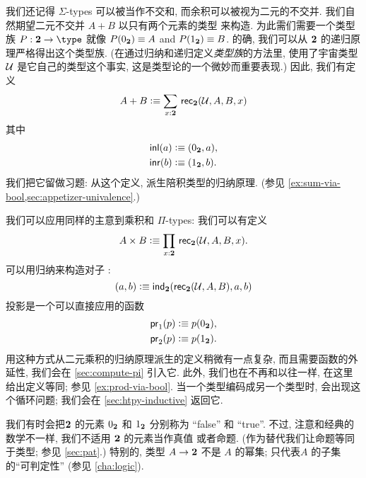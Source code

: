 我们还记得 $\Sigma$-types 可以被当作不交和,  而余积可以被视为二元的不交并. 我们自然期望二元不交并 $A+B$ 以只有两个元素的类型 \bool 来构造. 为此需们需要一个类型族 $P:\bool\to\type$ 就像 $P({0_{\mathbf{2}}})\equiv A$ and $P({1_{\mathbf{2}}})\equiv B$. 的确, 我们可以从 $\mathbf{2}$ 的递归原理严格得出这个类型族. %
(在通过归纳和递归定义\emph{类型族}的方法里, 使用了宇宙类型 $\mathcal{U}$ 是它自己的类型这个事实, 这是类型论的一个微妙而重要表现.) 因此, 我们有定义 %
\[ A + B \defeq \sm{x:\bool} \rec{\bool}(\UU,A,B,x) \]
其中 \begin{align*}
{\mathsf{inl}}(a) &\vcentcolon\equiv ({0_{\mathbf{2}}},a), \\
{\mathsf{inr}}(b) &\vcentcolon\equiv ({1_{\mathbf{2}}},b).
\end{align*}
我们把它留做习题: 从这个定义, 派生陪积类型的归纳原理. (参见 \cref{ex:sum-via-bool,sec:appetizer-univalence}.) 

我们可以应用同样的主意到乘积和 $\Pi$-types: 我们可以有定义 \[ A \times B \defeq \prd{x:\bool}\rec{\bool}(\UU,A,B,x). \]
可以用归纳来构造对子 \bool: \[ (a,b) \vcentcolon\equiv \mathsf{ind}_{\mathbf{2}}(\mathsf{rec}_{\mathbf{2}}(\mathcal{U},A,B),a,b) \]
投影是一个可以直接应用的函数 \begin{align*}
\mathsf{pr}_{1}(p) &\vcentcolon\equiv p({0_{\mathbf{2}}}), \\
\mathsf{pr}_{2}(p) &\vcentcolon\equiv p({1_{\mathbf{2}}}).
\end{align*}
用这种方式从二元乘积的归纳原理派生的定义稍微有一点复杂, 而且需要函数的外延性, 我们会在 \cref{sec:compute-pi} 引入它. 此外, 我们也在不再和以往一样, 在这里给出定义等同; 参见 \cref{ex:prod-via-bool}. 当一个类型编码成另一个类型时, 会出现这个循环问题; 我们会在 \cref{sec:htpy-inductive} 返回它.  

我们有时会把$\mathbf{2}$ 的元素 ${0_{\mathbf{2}}}$ 和 ${1_{\mathbf{2}}}$  分别称为 ``false'' 和 ``true''. 不过, 注意和经典的数学不一样, 我们不适用 $\mathbf{2}$ 的元素当作真值%
或者命题. (作为替代我们让命题等同于类型; 参见 \cref{sec:pat}.) 特别的, 类型 $A \to \mathbf{2}$ 不是 $A$ 的幂集; 只代表$A$ 的子集的``可判定性'' (参见 \cref{cha:logic}). %

%